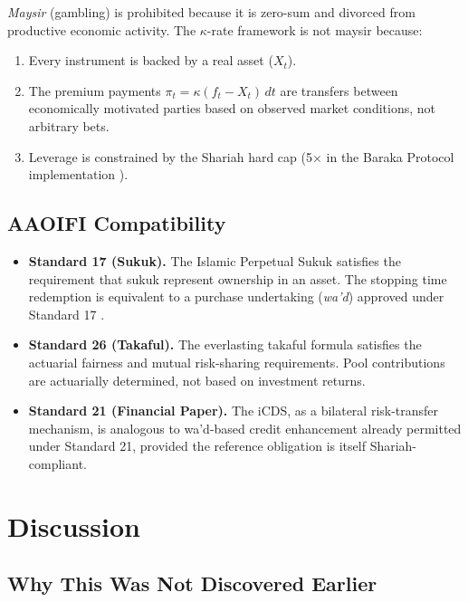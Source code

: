 \documentclass[10pt,twocolumn]{article}
\theoremstyle{plain}
\theoremstyle{definition}
\begin{document}
\textit{Maysir} (gambling) is prohibited because it is zero-sum
and divorced from productive economic activity. The $\kappa$-rate
framework is not maysir because:
\begin{enumerate}[leftmargin=*,noitemsep]
\item Every instrument is backed by a real asset ($X_t$).
\item The premium payments $\pi_t = \kappa(f_t - X_t)\,dt$ are
transfers between economically motivated parties based on observed
market conditions, not arbitrary bets.
\item Leverage is constrained by the Shariah hard cap (5$\times$
in the Baraka Protocol implementation \cite{Ahmed2026}).
\end{enumerate}

\subsection{AAOIFI Compatibility}

\begin{itemize}[leftmargin=*,noitemsep]
\item \textbf{Standard 17 (Sukuk).} The Islamic Perpetual Sukuk
satisfies the requirement that sukuk represent ownership in
an asset. The stopping time redemption is equivalent to a
purchase undertaking (\textit{wa'd}) approved under Standard 17
\cite{AAOIFI2017,AdamThomas2004}.
\item \textbf{Standard 26 (Takaful).} The everlasting takaful
formula satisfies the actuarial fairness and mutual risk-sharing
requirements. Pool contributions are actuarially determined, not
based on investment returns.
\item \textbf{Standard 21 (Financial Paper).} The iCDS, as a
bilateral risk-transfer mechanism, is analogous to wa'd-based credit
enhancement already permitted under Standard 21, provided the
reference obligation is itself Shariah-compliant.
\end{itemize}

\section{Discussion}
\label{sec:discussion}

\subsection{Why This Was Not Discovered Earlier}
\end{document}
